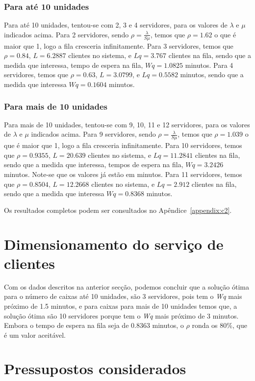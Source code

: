 \subsubsection{Para até 10 unidades}
Para até 10 unidades, tentou-se com 2, 3 e 4 servidores, para os valores de
$\lambda$ e $\mu$ indicados acima. Para 2 servidores, sendo $\rho = \frac{\lambda}{S \mu}$,
temos que $\rho=1.62$ o que é maior que 1, logo a fila cresceria infinitamente.
Para 3 servidores, temos que $\rho=0.84$, $L=6.2887$ clientes no sistema,
e $Lq=3.767$ clientes na fila, sendo que
a medida que interessa, tempo de espera na fila, $Wq=1.0825$ minutos. 
Para 4 servidores, temos que $\rho=0.63$, $L=3.0799$, e $Lq=0.5582$ minutos, sendo que
a medida que interessa $Wq=0.1604$ minutos. 


\subsubsection{Para mais de 10 unidades}

Para mais de 10 unidades, tentou-se com 9, 10, 11 e 12 servidores, para os valores de
$\lambda$ e $\mu$ indicados acima. Para 9 servidores, sendo $\rho = \frac{\lambda}{S \mu}$,
temos que $\rho=1.039$ o que é maior que 1, logo a fila cresceria infinitamente.
Para 10 servidores, temos que $\rho=0.9355$, $L=20.639$ clientes no sistema,
e $Lq=11.2841$ clientes na fila, sendo que
a medida que interessa, tempos de espera na fila, $Wq=3.2426$ minutos. Note-se que os valores já estão em minutos.
Para 11 servidores, temos que $\rho=0.8504$, $L=12.2668$ clientes no sistema,
e $Lq=2.912$ clientes na fila, sendo que
a medida que interessa $Wq=0.8368$ minutos. 

Os resultados completos podem ser consultados no Apêndice~\ref{appendix:c2}.

\section{Dimensionamento do serviço de clientes}

Com os dados descritos na anterior secção, podemos concluir que a solução ótima
para o número de caixas até 10 unidades, são 3 servidores, pois tem
o \emph{Wq} mais próximo de 1.5 minutos, e para caixas para mais de 10 unidades
temos que, a solução ótima são 10 servidores porque tem o \emph{Wq} mais próximo
de 3 minutos. Embora o tempo de espera na fila seja de 0.8363 minutos, o $\rho$
ronda os 80\%, que é um valor aceitável.


\section{Pressupostos considerados}

